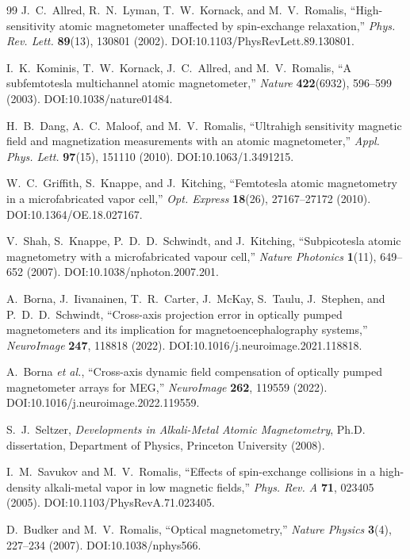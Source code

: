 \documentclass[11pt]{article}
\begin{document}
\begin{thebibliography}{99}\small
{} J.~C.~Allred, R.~N.~Lyman, T.~W.~Kornack, and M.~V.~Romalis,
``High-sensitivity atomic magnetometer unaffected by spin-exchange relaxation,''
\emph{Phys. Rev. Lett.} \textbf{89}(13), 130801 (2002).
DOI:10.1103/PhysRevLett.89.130801.

 I.~K.~Kominis, T.~W.~Kornack, J.~C.~Allred, and
M.~V.~Romalis, ``A subfemtotesla multichannel atomic magnetometer,''
\emph{Nature} \textbf{422}(6932), 596--599 (2003). DOI:10.1038/nature01484.

 H.~B.~Dang, A.~C.~Maloof, and M.~V.~Romalis, ``Ultrahigh
sensitivity magnetic field and magnetization measurements with an atomic
magnetometer,'' \emph{Appl. Phys. Lett.} \textbf{97}(15), 151110 (2010).
DOI:10.1063/1.3491215.

 W.~C.~Griffith, S.~Knappe, and J.~Kitching, ``Femtotesla
atomic magnetometry in a microfabricated vapor cell,'' \emph{Opt. Express}
\textbf{18}(26), 27167--27172 (2010). DOI:10.1364/OE.18.027167.

 V.~Shah, S.~Knappe, P.~D.~D.~Schwindt, and J.~Kitching,
``Subpicotesla atomic magnetometry with a microfabricated vapour cell,''
\emph{Nature Photonics} \textbf{1}(11), 649--652 (2007).
DOI:10.1038/nphoton.2007.201.

 A.~Borna, J.~Iivanainen, T.~R.~Carter, J.~McKay, S.~Taulu,
J.~Stephen, and P.~D.~D.~Schwindt, ``Cross-axis projection error in optically
pumped magnetometers and its implication for magnetoencephalography systems,''
\emph{NeuroImage} \textbf{247}, 118818 (2022).
DOI:10.1016/j.neuroimage.2021.118818.

 A.~Borna \emph{et al.}, ``Cross-axis dynamic field
compensation of optically pumped magnetometer arrays for MEG,''
\emph{NeuroImage} \textbf{262}, 119559 (2022).
DOI:10.1016/j.neuroimage.2022.119559.

 S.~J.~Seltzer, \emph{Developments in Alkali-Metal Atomic
Magnetometry}, Ph.D. dissertation, Department of Physics, Princeton University
(2008).

 I.~M.~Savukov and M.~V.~Romalis, ``Effects of spin-exchange
collisions in a high-density alkali-metal vapor in low magnetic fields,''
\emph{Phys. Rev. A} \textbf{71}, 023405 (2005). DOI:10.1103/PhysRevA.71.023405.

 D.~Budker and M.~V.~Romalis, ``Optical magnetometry,''
\emph{Nature Physics} \textbf{3}(4), 227--234 (2007). DOI:10.1038/nphys566.


\end{thebibliography}
\end{document}

